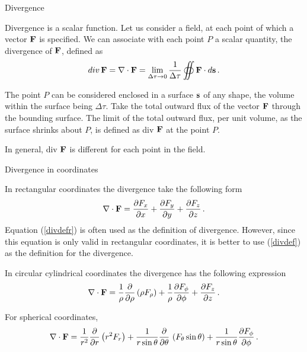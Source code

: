 \documentclass[handout,10pt]{beamer}
\begin{document}
\begin{frame}{Divergence}

%
Divergence is a scalar function. Let us consider a field, at each point of which a vector $\mathbf{F}$ is specified. We can associate with each point $P$ a scalar quantity, the divergence of $\mathbf{F}$, defined as
%
\begin{equation}
div \, {\bf F} = \nabla \cdot {\bf F} = 
\lim_{\Delta \tau \to 0} \frac{1}{\Delta \tau}   \oiint {\bf F}\cdot d{\bf s} \, .
 \label{divdef}
\end{equation}

The point $P$ can be considered enclosed in a surface $\mathbf{s}$ of any shape, the volume within the surface being $\Delta \tau$. 
Take the total outward flux of the vector $\mathbf{F}$ through the bounding surface. The limit of the total outward flux, per unit volume, as the surface shrinks about $P$, is defined as div $\mathbf{F}$ at the point $P$.

\pause
 In general, div $\mathbf{F}$ is different for each point in the field.

\end{frame}

\begin{frame}[shrink=00]{Divergence in coordinates }

In \alert{rectangular coordinates} the divergence take the following form
%
\begin{equation}
 \nabla \cdot {\bf F} = \frac{\partial F_x}{\partial x} +  \frac{\partial F_y}{\partial y} +  \frac{\partial F_z}{\partial z} \, .
 \label{divdefr}
\end{equation}
%
Equation (\ref{divdefr}) is often used as the definition of divergence. However, since this equation is only valid in rectangular coordinates, it is better to use (\ref{divdef}) as the definition for the divergence.

\pause

In \alert{circular cylindrical coordinates} the divergence has the following expression
%
\begin{equation}
 \nabla \cdot {\bf F} = \frac{1}{\rho} \frac{\partial}{\partial \rho} \left(\rho F_\rho \right) +  
\frac{1}{\rho}  \frac{\partial F_\phi}{\partial \phi} +  \frac{\partial F_z}{\partial z} \, .
 \label{divdefc}
\end{equation}
%

\pause

For \alert{spherical coordinates},
%
\begin{equation}
 \nabla \cdot {\bf F} = \frac{1}{r^2} \frac{\partial}{\partial r} \left(r^2 F_r \right) +  
\frac{1}{r \sin \theta}  \frac{\partial }{\partial \theta} \, \left( F_\theta \sin\theta\right) + \frac{1}{r \sin \theta}  \frac{\partial F_\phi}{\partial \phi} \, .
 \label{divdefs}
\end{equation}
%


\end{frame}
\end{document}
